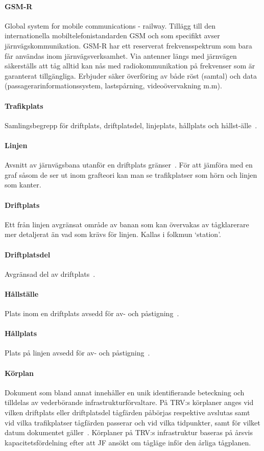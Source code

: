 \paragraph{GSM-R}
Global system for mobile communications - railway.
Tillägg till den internationella mobiltelefonistandarden GSM och som specifikt avser järnvägskommunikation.
GSM-R har ett reserverat frekvensspektrum som bara får användas inom järnvägsverksamhet.
Via antenner längs med järnvägen säkerställs att tåg alltid kan nås med radiokommunikation på frekvenser som är garanterat tillgängliga.
Erbjuder säker överföring av både röst (samtal) och data (passagerarinformationssystem, lastspårning, videoövervakning m.m).
~\cite{Malux2019}
\paragraph{Trafikplats}
Samlingsbegrepp för driftplats, driftplatsdel, linjeplats, hållplats och hållst-älle~\cite{TTJ2015}.
\paragraph{Linjen}
Avsnitt av järnvägsbana utanför en driftplats gränser~\cite{TTJ2015}.
För att jämföra med en graf såsom de ser ut inom grafteori kan man se trafikplatser som hörn och linjen som kanter.
\paragraph{Driftplats}
Ett från linjen avgränsat område av banan som kan övervakas av tågklarerare mer detaljerat än vad som krävs för linjen.
Kallas i folkmun \lq{}station\rq{}.
\paragraph{Driftplatsdel}
Avgränsad del av driftplats~\cite{TTJ2015}.
\paragraph{Hållställe}
Plats inom en driftplats avsedd för av- och påstigning~\cite{TTJ2015}.
\paragraph{Hållplats}
Plats på linjen avsedd för av- och påstigning~\cite{TTJ2015}.
\paragraph{Körplan}
Dokument som bland annat innehåller en unik identifierande beteckning och tilldelas av vederbörande infrastrukturförvaltare.
På TRV:s körplaner anges vid vilken driftplats eller driftplatsdel tågfärden påbörjas respektive avslutas samt vid vilka trafikplatser tågfärden passerar och vid vilka tidpunkter, samt för vilket datum dokumentet gäller~\cite{TTJ2015}.
Körplaner på TRV:s infrastruktur baseras på årsvis kapacitetsfördelning efter att JF ansökt om tågläge inför den årliga tågplanen.
